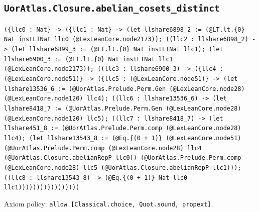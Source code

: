 \documentclass[11pt]{article}
\begin{document}
\subsection*{\texttt{UorAtlas.Closure.abelian\_cosets\_distinct}}
\noindent\texttt{(\{llc0 : Nat\} -> (\{llc1 : Nat\} -> (let llshare6898\_2 := (@LT.lt.\{0\} Nat instLTNat llc0 (@LexLeanCore.node2173)); ((llc2 : llshare6898\_2) -> (let llshare6899\_3 := (@LT.lt.\{0\} Nat instLTNat llc1); (let llshare6900\_3 := (@LT.lt.\{0\} Nat instLTNat llc1 (@LexLeanCore.node2173)); ((llc3 : llshare6900\_3) -> (\{llc4 : (@LexLeanCore.node51)\} -> (\{llc5 : (@LexLeanCore.node51)\} -> (let llshare13536\_6 := (@UorAtlas.Prelude.Perm.Gen (@LexLeanCore.node28) (@LexLeanCore.node120) llc4); ((llc6 : llshare13536\_6) -> (let llshare8418\_7 := (@UorAtlas.Prelude.Perm.Gen (@LexLeanCore.node28) (@LexLeanCore.node120) llc5); ((llc7 : llshare8418\_7) -> (let llshare451\_8 := (@UorAtlas.Prelude.Perm.comp (@LexLeanCore.node28) llc4); (let llshare13543\_8 := (@Eq.\{(0 + 1)\} (@LexLeanCore.node51) (@UorAtlas.Prelude.Perm.comp (@LexLeanCore.node28) llc4 (@UorAtlas.Closure.abelianRepP llc0)) (@UorAtlas.Prelude.Perm.comp (@LexLeanCore.node28) llc5 (@UorAtlas.Closure.abelianRepP llc1))); ((llc8 : llshare13543\_8) -> (@Eq.\{(0 + 1)\} Nat llc0 llc1)))))))))))))))))}\par
\noindent Axiom policy: \texttt{allow [Classical.choice, Quot.sound, propext]}.\par
\end{document}
